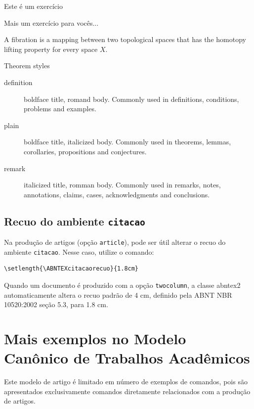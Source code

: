 \begin{exercicio}
	Este é um exercício
	
\end{exercicio}

\begin{exercicio}
	Mais um exercício para vocês...
	
\end{exercicio}


\begin{condicao}[Fibration]
	A fibration is a mapping between two topological spaces that has the homotopy lifting property for every space $X$.
\end{condicao}
Theorem styles

\begin{description}
	\item[definition] boldface title, romand body. Commonly used in definitions, conditions, problems and examples.
	\item[plain] boldface title, italicized body. Commonly used in theorems, lemmas, corollaries, propositions and conjectures.
	\item[remark] italicized title, romman body. Commonly used in remarks, notes, annotations, claims, cases, acknowledgments and conclusions. 
\end{description}



\subsection{Recuo do ambiente \texttt{citacao}}

Na produção de artigos (opção \texttt{article}), pode ser útil alterar o recuo
do ambiente \texttt{citacao}. Nesse caso, utilize o comando:

\begin{verbatim}
\setlength{\ABNTEXcitacaorecuo}{1.8cm}
\end{verbatim}

Quando um documento é produzido com a opção \texttt{twocolumn}, a classe
\textsf{abntex2} automaticamente altera o recuo padrão de 4 cm, definido pela
ABNT NBR 10520:2002 seção 5.3, para 1.8 cm.


\section{Mais exemplos no Modelo Canônico de Trabalhos Acadêmicos}

Este modelo de artigo é limitado em número de exemplos de comandos, pois são
apresentados exclusivamente comandos diretamente relacionados com a produção de
artigos.

